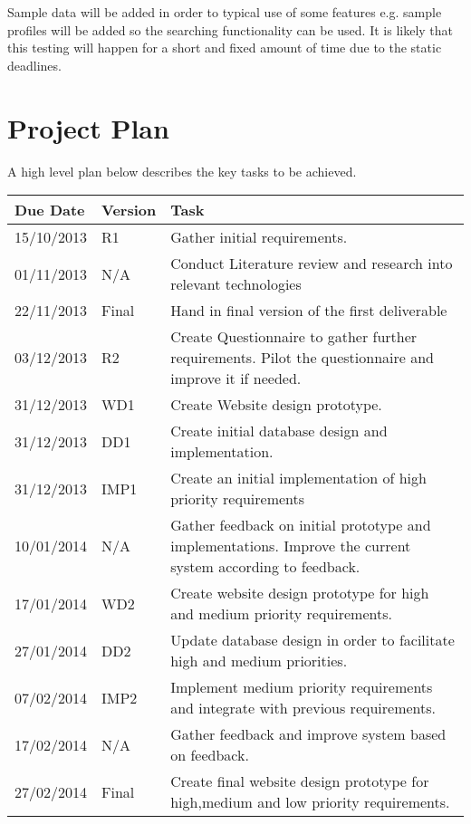 \documentclass[a4paper,oneside,11pt]{report}
\begin{document}
Sample data will be added in order to typical use of some features e.g. sample profiles will be added so the searching functionality can be used. It is likely that this testing will happen for a short and fixed amount of time due to the static deadlines.
\chapter{Project Plan}
A high level plan below describes the key tasks to be achieved.
\begin{center}
	\begin{table}[!ht]
    \begin{tabular}[ht]{| l | l | p{11cm} |}
    \hline
    Due Date & Version & Task \\ 
    \hline
    15/10/2013 & R1 & Gather initial requirements.\\ 
    \hline
    01/11/2013 & N/A & Conduct Literature review and research into relevant 												  technologies \\ 
    \hline
    22/11/2013 & Final & Hand in final version of the first deliverable \\ 
    \hline
    03/12/2013 & R2 & Create Questionnaire to gather further requirements. Pilot the 										questionnaire and improve it if needed.\\ 
    \hline
    31/12/2013 & WD1 & Create Website design prototype.\\
    \hline
    31/12/2013 & DD1 & Create initial database design and implementation.\\
    \hline
    31/12/2013 & IMP1 & Create an initial implementation of high priority requirements\\
    \hline
    10/01/2014 & N/A & Gather feedback on initial prototype and implementations. Improve 	                  				   the current system according to feedback.\\
    \hline
     17/01/2014 & WD2 & Create website design prototype for high and medium priority 										  requirements.\\
    \hline
    27/01/2014 & DD2 & Update database design in order to facilitate high and medium 		 								 priorities.\\
    \hline
    07/02/2014 & IMP2 & Implement medium priority requirements and integrate with previous requirements.		\\
    \hline
    17/02/2014 & N/A & Gather feedback and improve system based on feedback.\\
    \hline
    27/02/2014 & Final & Create final website design prototype for high,medium and low priority 			 			 requirements.\\

\end{tabular}
\end{table}
\end{center}
\end{document}
